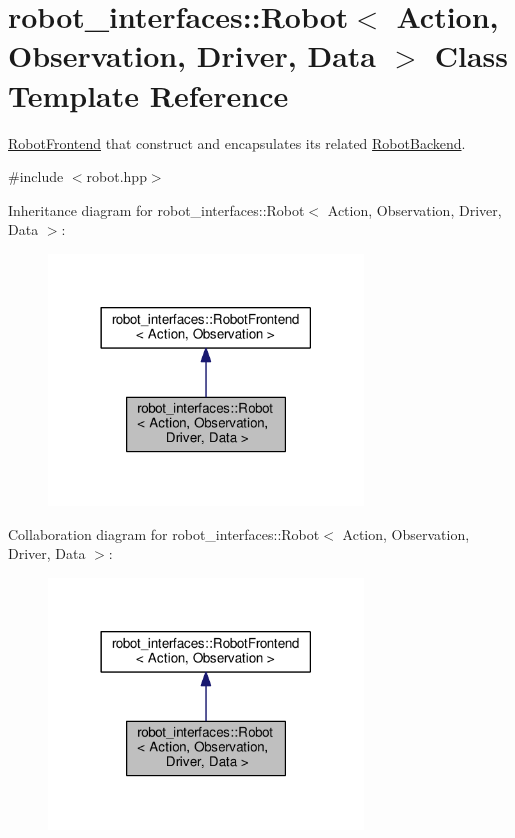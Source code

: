 \hypertarget{classrobot__interfaces_1_1Robot}{}\section{robot\+\_\+interfaces\+:\+:Robot$<$ Action, Observation, Driver, Data $>$ Class Template Reference}
\label{classrobot__interfaces_1_1Robot}


\hyperlink{classrobot__interfaces_1_1RobotFrontend}{Robot\+Frontend} that construct and encapsulates its related \hyperlink{classrobot__interfaces_1_1RobotBackend}{Robot\+Backend}.  




{\ttfamily \#include $<$robot.\+hpp$>$}



Inheritance diagram for robot\+\_\+interfaces\+:\+:Robot$<$ Action, Observation, Driver, Data $>$\+:
\nopagebreak
\begin{figure}[H]
\begin{center}
\leavevmode
\includegraphics[width=237pt]{classrobot__interfaces_1_1Robot__inherit__graph}
\end{center}
\end{figure}


Collaboration diagram for robot\+\_\+interfaces\+:\+:Robot$<$ Action, Observation, Driver, Data $>$\+:
\nopagebreak
\begin{figure}[H]
\begin{center}
\leavevmode
\includegraphics[width=237pt]{classrobot__interfaces_1_1Robot__coll__graph}
\end{center}
\end{figure}
